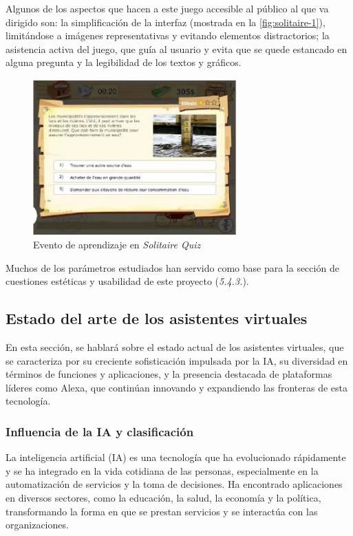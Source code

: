 Algunos de los aspectos que hacen a este juego accesible al público al que va dirigido son: la simplificación de la interfaz (mostrada en la \autoref{fig:solitaire-1}), limitándose a imágenes representativas y evitando elementos distractorios; la asistencia activa del juego, que guía al usuario y evita que se quede estancado en alguna pregunta y la legibilidad de los textos y gráficos.

\begin{figure}[H]
	\centering
	\includegraphics[width=0.7\textwidth]{imgs/solitaire-2.JPG}
	\caption{Evento de aprendizaje en \textit{Solitaire Quiz}}
	\label{fig:solitaire-2}
\end{figure}

Muchos de los parámetros estudiados han servido como base para la sección de cuestiones estéticas y usabilidad de este proyecto (\textit{5.4.3.}).

\subsection{Estado del arte de los asistentes virtuales}

En esta sección, se hablará sobre el estado actual de los asistentes virtuales, que se caracteriza por su creciente sofisticación impulsada por la IA, su diversidad en términos de funciones y aplicaciones, y la presencia destacada de plataformas líderes como Alexa, que continúan innovando y expandiendo las fronteras de esta tecnología.

\subsubsection{Influencia de la IA y clasificación}

La inteligencia artificial (IA) es una tecnología que ha evolucionado rápidamente y se ha integrado en la vida cotidiana de las personas, especialmente en la automatización de servicios y la toma de decisiones. Ha encontrado aplicaciones en diversos sectores, como la educación, la salud, la economía y la política, transformando la forma en que se prestan servicios y se interactúa con las organizaciones.

